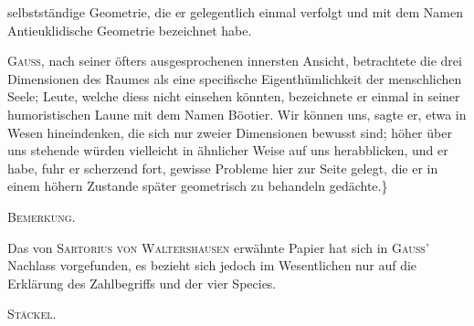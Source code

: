 %
selbstständige Geometrie, die er gelegentlich einmal verfolgt und mit dem Namen Antieuklidische Geometrie bezeichnet habe.

\textsc{Gauss}, nach seiner öfters ausgesprochenen innersten Ansicht, betrachtete die drei Dimensionen des Raumes als eine specifische Eigenthümlichkeit der menschlichen Seele; Leute, welche diess nicht einsehen könnten, bezeichnete er einmal in seiner humoristischen Laune mit dem Namen Böotier. Wir können uns, sagte er, etwa in Wesen hineindenken, die sich nur zweier Dimensionen bewusst sind; höher über uns stehende würden vielleicht in ähnlicher Weise auf uns herabblicken, und er habe, fuhr er scherzend fort, gewisse Probleme hier zur Seite gelegt, die er in einem höhern Zustande später geometrisch zu behandeln gedächte.\}

\begin{center}\textsc{Bemerkung.}\end{center}

Das von \textsc{Sartorius von Waltershausen} erwähnte Papier hat sich in \textsc{Gauss}' Nachlass vorgefunden, es bezieht sich jedoch im Wesentlichen nur auf die Erklärung des Zahlbegriffs und der vier Species.

\hfill \textsc{Stäckel}.
